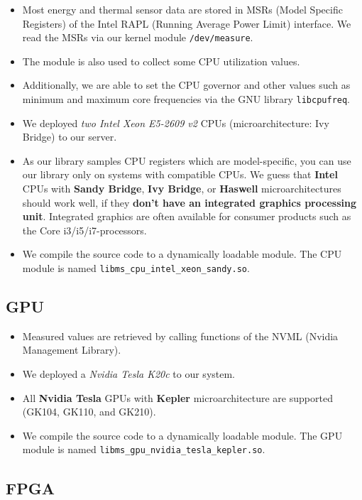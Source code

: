 \begin{itemize}
	\item Most energy and thermal sensor data are stored in MSRs (Model Specific Registers) of the Intel RAPL (Running Average Power Limit) interface. We read the MSRs via our kernel module \texttt{/dev/measure}.
	\item The module is also used to collect some CPU utilization values.
	\item Additionally, we are able to set the CPU governor and other values such as minimum and maximum core frequencies via the GNU library \texttt{libcpufreq}.
	\item We deployed \textit{two Intel Xeon E5-2609 v2} CPUs (microarchitecture: Ivy Bridge) to our server.
	\item As our library samples CPU registers which are model-specific, you can use our library only on systems with compatible CPUs. We guess that \textbf{Intel} CPUs with \textbf{Sandy Bridge}, \textbf{Ivy Bridge}, or \textbf{Haswell} microarchitectures should work well, if they \textbf{don't have an integrated graphics processing unit}. Integrated graphics are often available for consumer products such as the Core i3/i5/i7-processors.
	\item We compile the source code to a dynamically loadable module. The CPU module is named \texttt{libms\_cpu\_intel\_xeon\_sandy.so}.
\end{itemize}

\subsection{GPU}

\begin{itemize}
	\item Measured values are retrieved by calling functions of the NVML (Nvidia Management Library).
	\item We deployed a \textit{Nvidia Tesla K20c} to our system.
	\item All \textbf{Nvidia Tesla} GPUs with \textbf{Kepler} microarchitecture are supported (GK104, GK110, and GK210).
	\item We compile the source code to a dynamically loadable module. The GPU module is named \texttt{libms\_gpu\_nvidia\_tesla\_kepler.so}.
\end{itemize}

\subsection{FPGA}

